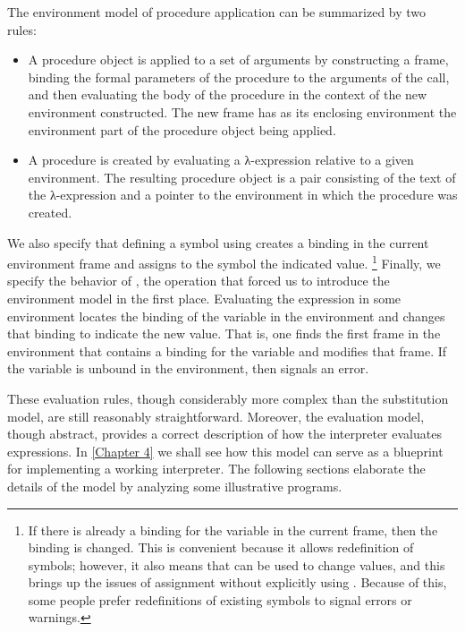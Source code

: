 The environment model of procedure application can be summarized by two rules:
\begin{itemize}

	\item
		A procedure object is applied to a set of arguments by constructing a frame, binding the formal parameters of the procedure to the arguments of the call, and then evaluating the body of the procedure in the context of the new environment constructed.
		The new frame has as its enclosing environment the environment part of the procedure object being applied.

	\item
		A procedure is created by evaluating a λ-expression relative to a given environment.
		The resulting procedure object is a pair consisting of the text of the λ-expression and a pointer to the environment in which the procedure was created.

\end{itemize}

We also specify that defining a symbol using  creates a binding in the current environment frame and assigns to the symbol the indicated value.%
\footnote{
	If there is already a binding for the variable in the current frame, then the binding is changed.
	This is convenient because it allows redefinition of symbols;
	however, it also means that  can be used to change values, and this brings up the issues of assignment without explicitly using .
	Because of this, some people prefer redefinitions of existing symbols to signal errors or warnings.
}
Finally, we specify the behavior of , the operation that forced us to introduce the environment model in the first place.
Evaluating the expression  in some environment locates the binding of the variable in the environment and changes that binding to indicate the new value.
That is, one finds the first frame in the environment that contains a binding for the variable and modifies that frame.
If the variable is unbound in the environment, then  signals an error.

These evaluation rules, though considerably more complex than the substitution model, are still reasonably straightforward.
Moreover, the evaluation model, though abstract, provides a correct description of how the interpreter evaluates expressions.
In \cref{Chapter 4} we shall see how this model can serve as a blueprint for implementing a working interpreter.
The following sections elaborate the details of the model by analyzing some illustrative programs.
